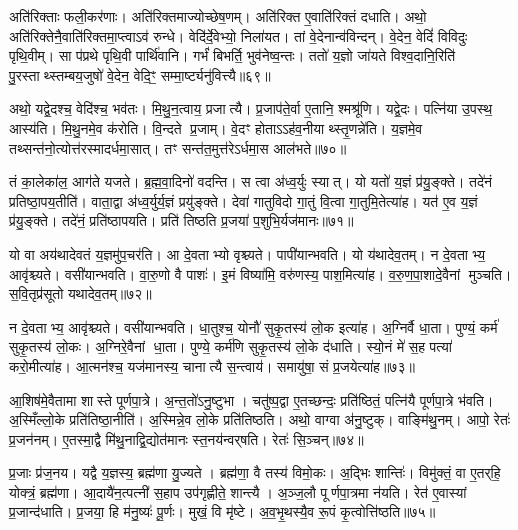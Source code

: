 अति॑रिक्ताः फली॒कर॑णाः।
अति॑रिक्तमाज्योच्छेष॒णम्।
अति॑रिक्त ए॒वाति॑रिक्तं दधाति।
अथो॒ अति॑रिक्तेनै॒वाति॑रिक्तमा॒प्त्वाऽव॑ रुन्धे।
वेदि॑र्दे॒वेभ्यो॒ निला॑यत।
तां वे॒देनान्व॑विन्दन्।
वे॒देन॒ वेदिं॑ विविदुः पृथि॒वीम्।
सा प॑प्रथे पृथि॒वी पार्थि॑वानि।
गर्भं॑ बिभर्ति॒ भुव॑नेष्व॒न्तः।
ततो॑ य॒ज्ञो जा॑यते विश्व॒दानि॒रिति॑ पु॒रस्ताथ्स्तम्बय॒जुषो॑ वे॒देन॒ वेदि॒ꣳ॒ सम्मा॒र्ष्ट्यनु॑वित्त्यै॥६९॥

अथो॒ यद्वे॒दश्च॒ वेदि॑श्च॒ भव॑तः।
मि॒थु॒न॒त्वाय॒ प्रजात्यै।
प्र॒जाप॑ते॒र्वा ए॒तानि॒ श्मश्रू॑णि।
यद्वे॒दः।
पत्नि॑या उ॒पस्थ॒ आस्य॑ति।
मि॒थु॒नमे॒व क॑रोति।
वि॒न्दते प्र॒जाम्।
वे॒दꣳ होता\-ऽऽह॑व॒नीयाथ्स्तृ॒णन्ने॑ति।
य॒ज्ञमे॒व तथ्सन्त॑नो॒त्योत्त॑रस्मादर्धमा॒सात्।
तꣳ सन्त॑त॒मुत्त॑रे\-ऽर्धमा॒स आल॑भते॥७०॥

तं का॒लेका॑ल॒ आग॑ते यजते।
ब्र॒ह्म॒वा॒दिनो॑ वदन्ति।
स त्वा अ॑ध्व॒र्युः स्यात्।
यो यतो॑ य॒ज्ञं प्र॑यु॒ङ्क्ते।
तदे॑नं प्रतिष्ठा॒पय॒तीति॑।
वाता॒द्वा अ॑ध्व॒र्युर्य॒ज्ञं प्रयु॑ङ्क्ते।
देवा॑ गातुविदो गा॒तुं वि॒त्वा गा॒तुमि॒तेत्या॑ह।
यत॑ ए॒व य॒ज्ञं प्र॑यु॒ङ्क्ते।
तदे॑नं॒ प्रति॑ष्ठापयति।
प्रति॑ तिष्ठति प्र॒जया॑ प॒शुभि॒र्यज॑मानः॥७१॥

यो वा अय॑थादेवतं य॒ज्ञमु॑प॒चर॑ति।
आ दे॒वताभ्यो वृश्च्यते।
पापी॑यान्भवति।
यो य॑थादेव॒तम्।
न दे॒वताभ्य॒ आवृ॑श्च्यते।
वसी॑यान्भवति।
वा॒रु॒णो वै पाशः॑।
इ॒मं विष्या॑मि॒ वरु॑णस्य॒ पाश॒मित्या॑ह।
व॒रु॒ण॒पा॒शादे॒वैनां मुञ्चति।
स॒वि॒तृप्र॑सूतो यथादेव॒तम्॥७२॥

न दे॒वताभ्य॒ आवृ॑श्च्यते।
वसी॑यान्भवति।
धा॒तुश्च॒ योनौ॑ सुकृ॒तस्य॑ लो॒क इत्या॑ह।
अ॒ग्निर्वै धा॒ता।
पुण्यं॒ कर्म॑ सुकृ॒तस्य॑ लो॒कः।
अ॒ग्निरे॒वैनां धा॒ता।
पुण्ये॒ कर्म॑णि सुकृ॒तस्य॑ लो॒के द॑धाति।
स्यो॒नं मे॑ स॒ह पत्या॑ करो॒मीत्या॑ह।
आ॒त्मन॑श्च॒ यज॑मानस्य॒ चानात्यै स॒न्त्वाय॑।
समायु॑षा॒ सं प्र॒जयेत्या॑ह॥७३॥

आ॒शिष॑मे॒वैतामा शास्ते पूर्णपा॒त्रे।
अ॒न्त॒तो॑\-ऽनु॒ष्टुभा।
चतु॑ष्प॒द्वा ए॒तच्छन्दः॒ प्रति॑ष्ठितं॒ पत्नि॑यै पूर्णपा॒त्रे भ॑वति।
अ॒स्मिँल्लो॒के प्रति॑तिष्ठा॒नीति॑।
अ॒स्मिन्ने॒व लो॒के प्रति॑तिष्ठति।
अथो॒ वाग्वा अ॑नु॒ष्टुक्।
वाङ्मि॑थु॒नम्।
आपो॒ रेतः॑ प्र॒जन॑नम्।
ए॒तस्मा॒द्वै मि॑थु॒नाद्वि॒द्योत॑मानः स्त॒नय॑न्वर्‌\mbox{}षति।
रेतः॑ सि॒ञ्चन्॥७४॥

प्र॒जाः प्र॑ज॒नय\sn{}।
यद्वै य॒ज्ञस्य॒ ब्रह्म॑णा यु॒ज्यते।
ब्रह्म॑णा॒ वै तस्य॑ विमो॒कः।
अ॒द्भिः शान्तिः॑।
विमु॑क्तं॒ वा ए॒तर्‌\mbox{}हि॒ योक्त्रं॒ ब्रह्म॑णा।
आ॒दायै॑न॒त्पत्नी॑ स॒हाप उप॑गृह्णीते॒ शान्त्यै।
अ॒ञ्ज॒लौ पूर्णपा॒त्रमा न॑यति।
रेत॑ ए॒वास्यां प्र॒जान्द॑धाति।
प्र॒जया॒ हि म॑नु॒ष्यः॑ पू॒र्णः।
मुखं॒ वि मृ॑ष्टे।
अ॒व॒भृ॒थस्यै॒व रू॒पं कृ॒त्वोत्ति॑ष्ठति॥७५॥\anuvakamend[स॒वि॒तृप्र॑सूतो यथादेव॒तं प्र॒जयेत्या॑ह सि॒ञ्चन्मृ॑ष्ट॒ एकं॑ च]

